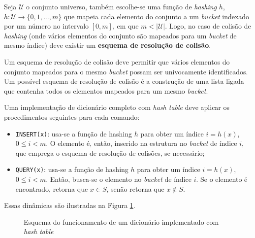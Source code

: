 \documentclass[12pt,twoside,english,brazilian]{article}
\begin{document}
Seja $\mathcal{U}$ o conjunto universo, também escolhe-se uma função de \textit{hashing} $h$, $h: \mathcal{U} \xrightarrow{} \{0,1,...,m\}$ que mapeia cada elemento do conjunto a um \textit{bucket} indexado por um número no intervalo $[0,m]$, em que $m < |\mathcal{U}|$. Logo, no caso de colisão de \textit{hashing} (onde vários elementos do conjunto são mapeados para um \textit{bucket} de mesmo índice) deve existir um \textbf{esquema de resolução de colisão}.

Um esquema de resolução de colisão deve permitir que vários elementos do conjunto mapeados para o mesmo \textit{bucket} possam ser univocamente identificados. Um possível esquema de resolução de colisão é a construção de uma lista ligada que contenha todos os elementos mapeados para um mesmo \textit{bucket}.

Uma implementação de dicionário completo com \textit{hash table} deve aplicar os procedimentos seguintes para cada comando:
\begin{itemize}
    \item \texttt{INSERT(x)}: usa-se a função de hashing $h$ para obter um índice $i = h(x)$, $0 \leq i < m$. O elemento é, então, inserido na estrutura no \textit{bucket} de índice $i$, que emprega o esquema de resolução de colisões, se necessário;
    \item \texttt{QUERY(x)}: usa-se a função de hashing $h$ para obter um índice $i = h(x)$, $0 \leq i < m$. Então, busca-se o elemento no \textit{bucket} de índice $i$. Se o elemento é encontrado, retorna que $x \in S$, senão retorna que $x \notin S$.
\end{itemize}

Essas dinâmicas são ilustradas na Figura \ref{hash-table}.

\begin{figure}
    \begin{center}
        \caption{\label{hash-table} Esquema do funcionamento de um dicionário implementado com \textit{hash table}}
    \end{center}
\end{figure}
\end{document}

